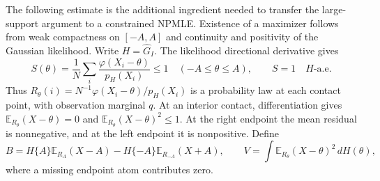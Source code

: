 \documentclass[11pt,a4paper]{article}
\theoremstyle{definition}
\theoremstyle{remark}
\numberwithin{equation}{section}
\begin{document}
The following estimate is the additional ingredient needed to
transfer the large-support argument to a constrained NPMLE.
Existence of a maximizer follows from weak compactness on $[-A,A]$
and continuity and positivity of the Gaussian likelihood.
Write $H=\widehat G_I$.  The likelihood directional derivative gives
\[
 S(\theta)=\frac1N\sum_i\frac{\varphi(X_i-\theta)}{p_H(X_i)}\le1
       \quad(-A\le\theta\le A),\qquad S=1\quad H\text{-a.e.}
\]
Thus $R_\theta(i)=N^{-1}\varphi(X_i-\theta)/p_H(X_i)$ is a
probability law at each contact point, with observation marginal $q$.
At an interior contact, differentiation gives
$\mathbb E_{R_\theta}(X-\theta)=0$ and
$\mathbb E_{R_\theta}(X-\theta)^2\le1$.
At the right endpoint the mean residual is nonnegative, and at the
left endpoint it is nonpositive.  Define
\[
 B=H\{A\}\mathbb E_{R_A}(X-A)
       -H\{-A\}\mathbb E_{R_{-A}}(X+A),\qquad
 V=\int\mathbb E_{R_\theta}(X-\theta)^2\,dH(\theta),
\]
where a missing endpoint atom contributes zero.
\end{document}
